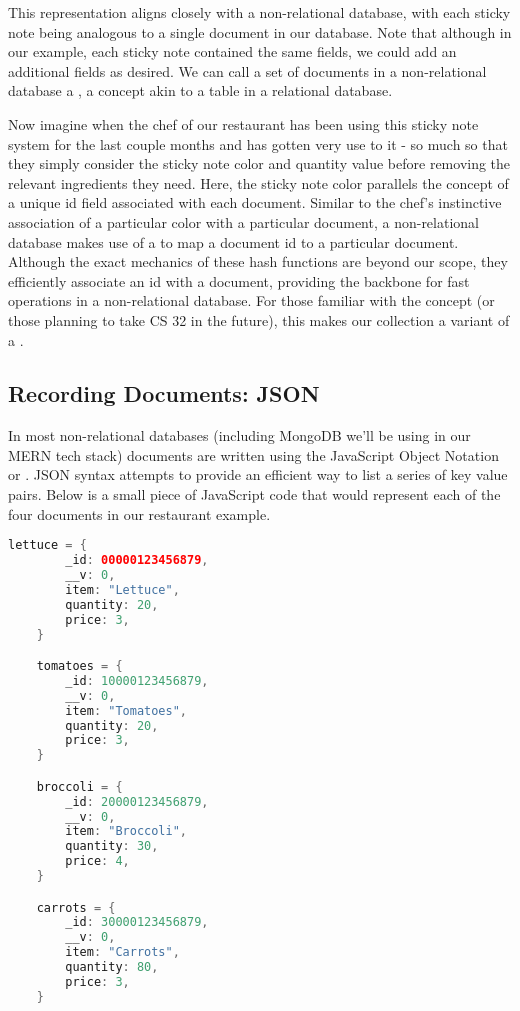 This representation aligns closely with a non-relational database, with each sticky note being analogous to a single document in our database. Note that although in our example, each sticky note contained the same fields, we could add an additional fields as desired. We can call a set of documents in a non-relational database a , a concept akin to a table in a relational database.

Now imagine when the chef of our restaurant has been using this sticky note system for the last couple months and has gotten very use to it - so much so that they simply consider the sticky note color and quantity value before removing the relevant ingredients they need. Here, the sticky note color parallels the concept of a unique id field associated with each document. Similar to the chef's instinctive association of a particular color with a particular document, a non-relational database makes use of a  to map a document id to a particular document. Although the exact mechanics of these hash functions are beyond our scope, they efficiently associate an id with a document, providing the backbone for fast operations in a non-relational database. For those familiar with the concept (or those planning to take CS 32 in the future), this makes our collection a variant of a .

\subsection*{Recording Documents: JSON}

In most non-relational databases (including MongoDB we'll be using in our MERN tech stack) documents are written using the JavaScript Object Notation or . JSON syntax attempts to provide an efficient way to list a series of key value pairs. Below is a small piece of JavaScript code that would represent each of the four documents in our restaurant example. 

\vspace{.5cm}

\begin{lstlisting}[language=Java]
    lettuce = {
        _id: 00000123456879,
        __v: 0,
        item: "Lettuce",
        quantity: 20,
        price: 3,
    }

    tomatoes = {
        _id: 10000123456879,
        __v: 0,
        item: "Tomatoes",
        quantity: 20,
        price: 3,
    }

    broccoli = {
        _id: 20000123456879,
        __v: 0,
        item: "Broccoli",
        quantity: 30,
        price: 4,
    }

    carrots = {
        _id: 30000123456879,
        __v: 0,
        item: "Carrots",
        quantity: 80,
        price: 3,
    }
\end{lstlisting}

